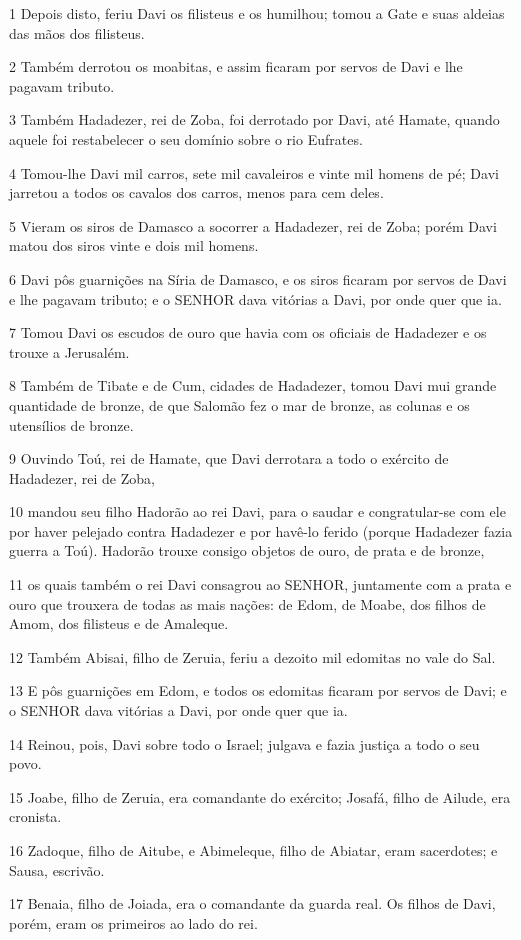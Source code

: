 \par 1 Depois disto, feriu Davi os filisteus e os humilhou; tomou a Gate e suas aldeias das mãos dos filisteus.
\par 2 Também derrotou os moabitas, e assim ficaram por servos de Davi e lhe pagavam tributo.
\par 3 Também Hadadezer, rei de Zoba, foi derrotado por Davi, até Hamate, quando aquele foi restabelecer o seu domínio sobre o rio Eufrates.
\par 4 Tomou-lhe Davi mil carros, sete mil cavaleiros e vinte mil homens de pé; Davi jarretou a todos os cavalos dos carros, menos para cem deles.
\par 5 Vieram os siros de Damasco a socorrer a Hadadezer, rei de Zoba; porém Davi matou dos siros vinte e dois mil homens.
\par 6 Davi pôs guarnições na Síria de Damasco, e os siros ficaram por servos de Davi e lhe pagavam tributo; e o SENHOR dava vitórias a Davi, por onde quer que ia.
\par 7 Tomou Davi os escudos de ouro que havia com os oficiais de Hadadezer e os trouxe a Jerusalém.
\par 8 Também de Tibate e de Cum, cidades de Hadadezer, tomou Davi mui grande quantidade de bronze, de que Salomão fez o mar de bronze, as colunas e os utensílios de bronze.
\par 9 Ouvindo Toú, rei de Hamate, que Davi derrotara a todo o exército de Hadadezer, rei de Zoba,
\par 10 mandou seu filho Hadorão ao rei Davi, para o saudar e congratular-se com ele por haver pelejado contra Hadadezer e por havê-lo ferido (porque Hadadezer fazia guerra a Toú). Hadorão trouxe consigo objetos de ouro, de prata e de bronze,
\par 11 os quais também o rei Davi consagrou ao SENHOR, juntamente com a prata e ouro que trouxera de todas as mais nações: de Edom, de Moabe, dos filhos de Amom, dos filisteus e de Amaleque.
\par 12 Também Abisai, filho de Zeruia, feriu a dezoito mil edomitas no vale do Sal.
\par 13 E pôs guarnições em Edom, e todos os edomitas ficaram por servos de Davi; e o SENHOR dava vitórias a Davi, por onde quer que ia.
\par 14 Reinou, pois, Davi sobre todo o Israel; julgava e fazia justiça a todo o seu povo.
\par 15 Joabe, filho de Zeruia, era comandante do exército; Josafá, filho de Ailude, era cronista.
\par 16 Zadoque, filho de Aitube, e Abimeleque, filho de Abiatar, eram sacerdotes; e Sausa, escrivão.
\par 17 Benaia, filho de Joiada, era o comandante da guarda real. Os filhos de Davi, porém, eram os primeiros ao lado do rei.

